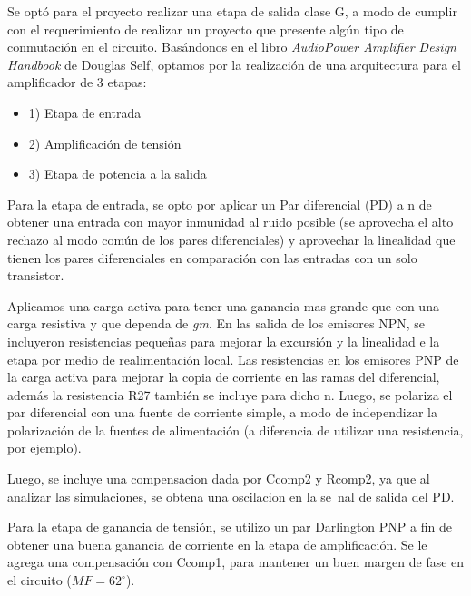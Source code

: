 \par Se optó para el proyecto realizar una etapa de salida clase G, a modo de cumplir con el requerimiento de realizar un proyecto que presente algún tipo de conmutación en el circuito. Basándonos en el libro \textit{AudioPower Amplifier Design Handbook} de Douglas Self, optamos por la realización de una arquitectura para el amplificador de 3 etapas:\\

\begin{itemize}
    \item 1) Etapa de entrada
    \item 2) Amplificación de tensión
    \item 3) Etapa de potencia a la salida
\end{itemize}

\par Para la etapa de entrada, se opto por aplicar un Par diferencial (PD) a n de obtener una entrada con mayor inmunidad al ruido posible (se aprovecha el alto rechazo al modo común de los pares diferenciales) y aprovechar la linealidad que tienen los pares diferenciales en comparación con las entradas con un solo transistor.\\

\par Aplicamos una carga activa para tener una ganancia mas grande que con una carga resistiva y que dependa de \textit{gm}. En las salida de los emisores NPN, se incluyeron resistencias pequeñas para mejorar la excursión y la linealidad e la etapa por medio de realimentación local. Las resistencias en los emisores PNP de la carga activa para mejorar la copia de corriente en las ramas del diferencial, además la resistencia R27 también se incluye para dicho n. Luego, se polariza el par diferencial con una fuente de corriente simple, a modo de independizar la polarización de la fuentes de alimentación (a diferencia de utilizar una resistencia, por ejemplo).\\

\par Luego, se incluye una compensacion dada por Ccomp2 y Rcomp2, ya que al analizar las simulaciones, se obtena una oscilacion en la se~nal de salida del PD.\\

\par Para la etapa de ganancia de tensión, se utilizo un par Darlington PNP a fin de obtener una buena ganancia de corriente en la etapa de amplificación. Se le agrega una compensación con Ccomp1, para mantener un buen margen de fase en el circuito ($MF = 62^\circ $).\\

